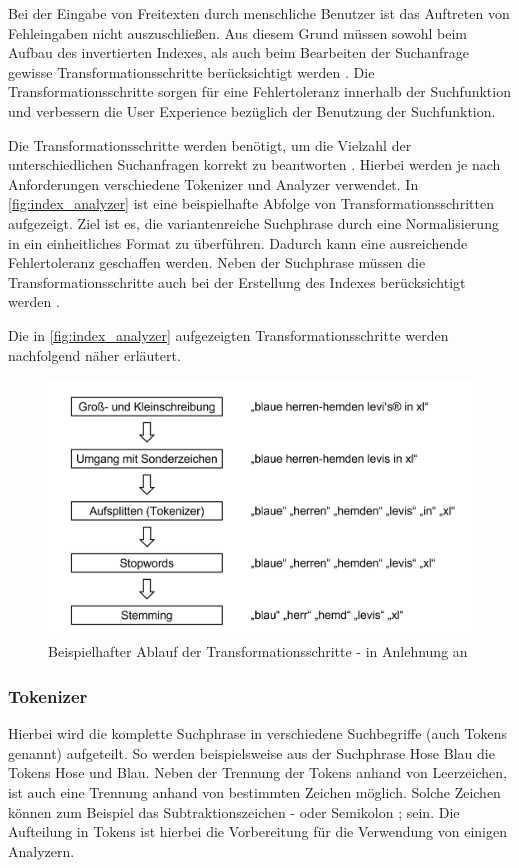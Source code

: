 Bei der Eingabe von Freitexten durch menschliche Benutzer ist das Auftreten von Fehleingaben nicht auszuschließen. Aus diesem Grund müssen sowohl beim Aufbau des invertierten Indexes, als auch beim Bearbeiten der Suchanfrage gewisse Transformationsschritte berücksichtigt werden \cite{SebastianRuss.2017}. Die Transformationsschritte sorgen für eine Fehlertoleranz innerhalb der Suchfunktion und verbessern die User Experience bezüglich der Benutzung der Suchfunktion.

Die Transformationsschritte werden benötigt, um die Vielzahl der unterschiedlichen Suchanfragen korrekt zu beantworten \cite{SebastianRuss.2017}. Hierbei werden je nach Anforderungen verschiedene Tokenizer und Analyzer verwendet. In \autoref{fig:index_analyzer} ist eine beispielhafte Abfolge von Transformationsschritten aufgezeigt. Ziel ist es, die variantenreiche Suchphrase durch eine Normalisierung in ein einheitliches Format zu überführen. Dadurch kann eine ausreichende Fehlertoleranz geschaffen werden. Neben der Suchphrase müssen die Transformationsschritte auch bei der Erstellung des Indexes berücksichtigt werden \cite{SebastianRuss.2017}.

Die in \autoref{fig:index_analyzer} aufgezeigten Transformationsschritte werden nachfolgend näher erläutert.

\begin{figure}[H]
    \centering
    \includegraphics[width=0.65\linewidth]{images/Index_Analyzer.png}
    \caption{Beispielhafter Ablauf der Transformationsschritte - in Anlehnung an \cite{SebastianRuss.2017}}
    \label{fig:index_analyzer}
\end{figure}

\subsubsection{Tokenizer}

Hierbei wird die komplette Suchphrase in verschiedene Suchbegriffe (auch Tokens genannt) aufgeteilt. So werden beispielsweise aus der Suchphrase \glqq Hose Blau\grqq{} die Tokens \glqq Hose\grqq{} und \glqq Blau\grqq{}. Neben der Trennung der Tokens anhand von Leerzeichen, ist auch eine Trennung anhand von bestimmten Zeichen möglich. Solche Zeichen können zum Beispiel das Subtraktionszeichen \glqq -\grqq{} oder Semikolon \glqq ;\grqq{} sein. Die Aufteilung in Tokens ist hierbei die Vorbereitung für die Verwendung von einigen Analyzern.

